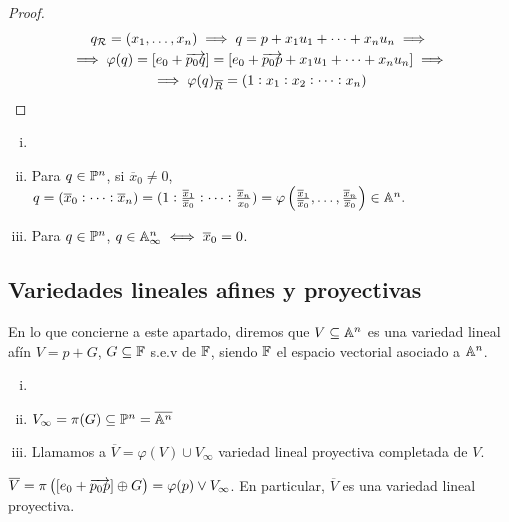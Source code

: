 \begin{proof}
  \begin{gather*}
    q_{\mathcal{R}} = \left( x_1, \dots, x_n \right) \implies q = p + x_1u_1 + \dots + x_nu_n \implies \\
    \implies \varphi(q) = [e_0 + \overrightarrow{p_0q}] = [e_0+\overrightarrow{p_0p}
    + x_1u_1 + \dots + x_nu_n]\implies\\
    \implies \varphi(q)_{\overline{R}} = \left( 1 : x_1 : x_2 : \dots : x_n \right)
  \end{gather*}
\end{proof}

\begin{obs}
  \begin{enumerate}[i)]
    \item[]
    \item Para $q \in \mathbb{P}^n$, si $\overline{x}_0 \neq 0$, $q = (\overline{x}_0:
      \dots:\overline{x}_n) = (1:\frac{\overline{x}_1}{\overline{x}_0}:
      \dots:\frac{\overline{x}_n}{x_0}) = \varphi \left( \frac{\overline{x}_1}{\overline{x}_0}
      ,\dots,\frac{\overline{x}_n}{\overline{x}_0} \right) \in \mathbb{A}^n.$
    \item Para $q \in \mathbb{P}^n$, $q \in \mathbb{A}^n_\infty \iff \overline{x}_0 = 0$.
  \end{enumerate}
\end{obs}

\subsection{Variedades lineales afines y proyectivas}

En lo que concierne a este apartado, diremos que $V \subseteq \mathbb{A}^n$ es una variedad 
lineal afín $V = p+G$, $G \subseteq \mathbb{F}$ s.e.v de $\mathbb{F}$, siendo $\mathbb{F}$ el espacio vectorial
asociado a $\mathbb{A}^n$.

\begin{defi}
  \begin{enumerate}[i)]
    \item[]
    \item $V_\infty = \pi(G) \subseteq \mathbb{P}^n = \overline{\mathbb{A}^n}$
    \item Llamamos a $\overline{V} = \varphi(V) \cup V_\infty$ variedad lineal 
      proyectiva completada de $V$.
  \end{enumerate}
\end{defi}

\begin{prop}
  $\overline{V} = \pi \left( [e_0 + \overrightarrow{p_0p}] \oplus G \right) = \varphi(p) \vee
  V_\infty$. En particular, $\overline{V}$ es una variedad lineal proyectiva. 
\end{prop}

